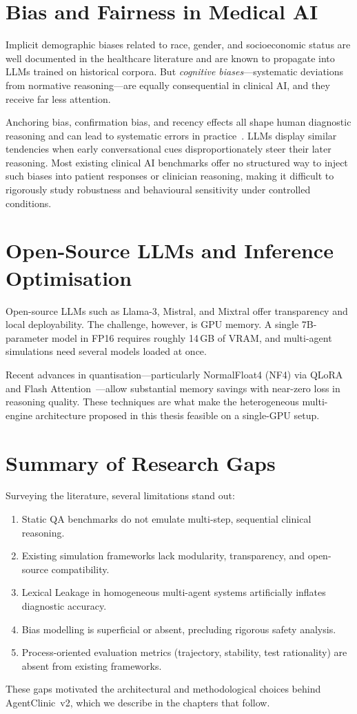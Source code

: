 \section{Bias and Fairness in Medical AI}

Implicit demographic biases related to race, gender, and socioeconomic status are well documented in the healthcare literature and are known to propagate into LLMs trained on historical corpora. But \textit{cognitive biases}—systematic deviations from normative reasoning—are equally consequential in clinical AI, and they receive far less attention.

Anchoring bias, confirmation bias, and recency effects all shape human diagnostic reasoning and can lead to systematic errors in practice~\cite{johri2023guidelines}. LLMs display similar tendencies when early conversational cues disproportionately steer their later reasoning. Most existing clinical AI benchmarks offer no structured way to inject such biases into patient responses or clinician reasoning, making it difficult to rigorously study robustness and behavioural sensitivity under controlled conditions.

\section{Open-Source LLMs and Inference Optimisation}

Open-source LLMs such as Llama-3, Mistral, and Mixtral offer transparency and local deployability. The challenge, however, is GPU memory. A single 7B-parameter model in FP16 requires roughly 14\,GB of VRAM, and multi-agent simulations need several models loaded at once.

Recent advances in quantisation—particularly NormalFloat4 (NF4) via QLoRA and Flash Attention~\cite{du2023improving}—allow substantial memory savings with near-zero loss in reasoning quality. These techniques are what make the heterogeneous multi-engine architecture proposed in this thesis feasible on a single-GPU setup.

\section{Summary of Research Gaps}

Surveying the literature, several limitations stand out:
\begin{enumerate}
    \item Static QA benchmarks do not emulate multi-step, sequential clinical reasoning.
    \item Existing simulation frameworks lack modularity, transparency, and open-source compatibility.
    \item Lexical Leakage in homogeneous multi-agent systems artificially inflates diagnostic accuracy.
    \item Bias modelling is superficial or absent, precluding rigorous safety analysis.
    \item Process-oriented evaluation metrics (trajectory, stability, test rationality) are absent from existing frameworks.
\end{enumerate}

These gaps motivated the architectural and methodological choices behind AgentClinic~v2, which we describe in the chapters that follow.
